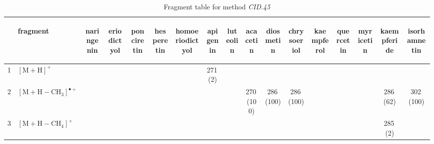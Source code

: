 \documentclass[]{article}
\begin{document}
\begin{table}\caption{Fragment table for method \textit{CID.45}}{\scriptsize
\begin{tabular}{ll|ccccc|ccccc|ccccc}
  \toprule
 & \begin{sideways} fragment \end{sideways} & \begin{sideways} naringenin \end{sideways} & \begin{sideways} eriodictyol \end{sideways} & \begin{sideways} ponciretin \end{sideways} & \begin{sideways} hesperetin \end{sideways} & \begin{sideways} homoeriodictyol \end{sideways} & \begin{sideways} apigenin \end{sideways} & \begin{sideways} luteolin \end{sideways} & \begin{sideways} acacetin \end{sideways} & \begin{sideways} diosmetin \end{sideways} & \begin{sideways} chrysoeriol \end{sideways} & \begin{sideways} kaempferol \end{sideways} & \begin{sideways} quercetin \end{sideways} & \begin{sideways} myricetin \end{sideways} & \begin{sideways} kaempferide \end{sideways} & \begin{sideways} isorhamnetin \end{sideways} \\ 
  \midrule
1 & $\mathrm{[M{+}H]^+}$ &  &  &  &  &  & 271\,(2) &  &  &  &  &  &  &  &  &  \\ 
  2 & $\mathrm{[M{+}H{-}CH_{3}]^{\bullet+}}$ &  &  &  &  &  &  &  & 270\,(100) & 286\,(100) & 286\,(100) &  &  &  & 286\,(62) & 302\,(100) \\ 
  3 & $\mathrm{[M{+}H{-}CH_{4}]^+}$ &  &  &  &  &  &  &  &  &  &  &  &  &  & 285\,(2) &  \\ 

\end{tabular}}
\end{table}
\end{document}
